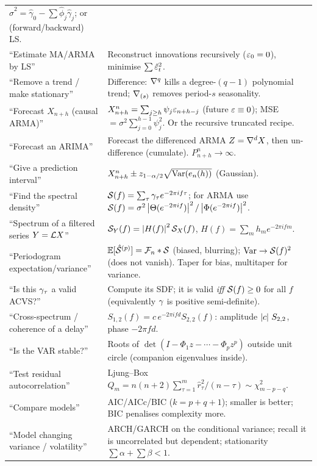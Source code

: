 \begin{tcolorbox}
\begin{tabular}{@{}p{}@{\hspace{0.5em}}p{}@{}}
$\hat\sigma^2=\hat\gamma_0-\sum\hat\phi_j\hat\gamma_j$; or (forward/backward) LS.\\
``Estimate MA/ARMA by LS'' &
Reconstruct innovations recursively ($\varepsilon_0=0$), minimise $\sum\hat{\varepsilon}_t^2$.\\
``Remove a trend / make stationary'' &
Difference: $\nabla^q$ kills a degree-$(q-1)$ polynomial trend; $\nabla_{(s)}$
removes period-$s$ seasonality.\\
``Forecast $X_{n+h}$ (causal ARMA)'' &
$X^n_{n+h}=\sum_{j\ge h}\psi_j\varepsilon_{n+h-j}$ (future $\varepsilon\equiv0$); MSE
$=\sigma^2\sum_{j=0}^{h-1}\psi_j^2$. Or the recursive truncated recipe.\\
``Forecast an ARIMA'' &
Forecast the differenced ARMA $Z=\nabla^dX$, then un-difference (cumulate).
$P^n_{n+h}\to\infty$.\\
``Give a prediction interval'' &
$X^n_{n+h}\pm z_{1-\alpha/2}\sqrt{\operatorname{Var}(e_n(h))}$ (Gaussian).\\
``Find the spectral density'' &
$\mathcal{S}(f)=\sum_\tau\gamma_\tau e^{-2\pi i f\tau}$; for ARMA use
$\mathcal{S}(f)=\sigma^2\left\lvert \Theta(e^{-2\pi i f}) \right\rvert^2/\left\lvert \Phi(e^{-2\pi i f}) \right\rvert^2$.\\
``Spectrum of a filtered series $Y=\mathcal{L} X$'' &
$\mathcal{S}_Y(f)=\left\lvert H(f) \right\rvert^2\mathcal{S}_X(f)$, $H(f)=\sum_m h_m e^{-2\pi i f m}$.\\
``Periodogram expectation/variance'' &
$\mathbb{E}[\hat{\mathcal{S}}^{(p)}]=\mathcal{F}_n*\mathcal{S}$ (biased, blurring); $\operatorname{Var}\to\mathcal{S}(f)^2$ (does
not vanish). Taper for bias, multitaper for variance.\\
``Is this $\gamma_\tau$ a valid ACVS?'' &
Compute its SDF; it is valid \emph{iff} $\mathcal{S}(f)\ge0$ for all $f$ (equivalently
$\gamma$ is positive semi-definite).\\
``Cross-spectrum / coherence of a delay'' &
$S_{1,2}(f)=c\,e^{-2\pi i f d}S_{2,2}(f)$: amplitude $\left\lvert c \right\rvert\,S_{2,2}$, phase
$-2\pi f d$.\\
``Is the VAR stable?'' &
Roots of $\det(I-\Phi_1z-\cdots-\Phi_pz^p)$ outside unit circle (companion
eigenvalues inside).\\
``Test residual autocorrelation'' &
Ljung--Box $Q_m=n(n+2)\sum_{\tau=1}^m\hat r_\tau^2/(n-\tau)\sim\chi^2_{m-p-q}$.\\
``Compare models'' &
AIC/AICc/BIC ($k=p+q+1$); smaller is better; BIC penalises complexity more.\\
``Model changing variance / volatility'' &
ARCH/GARCH on the conditional variance; recall it is uncorrelated but
dependent; stationarity $\sum\alpha+\sum\beta<1$.\\
\bottomrule
\end{tabular}
\end{tcolorbox}

